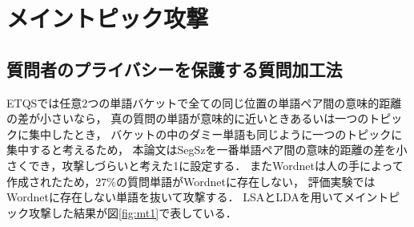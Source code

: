 \documentclass[master]{suribt}
\theoremstyle{definition}
\begin{document}
 \section{メイントピック攻撃}
 \subsection{質問者のプライバシーを保護する質問加工法}
 ETQSでは任意2つの単語バケットで全ての同じ位置の単語ペア間の意味的距離の差が小さいなら，
 真の質問の単語が意味的に近いときあるいは一つのトピックに集中したとき，
 バケットの中のダミー単語も同じように一つのトピックに集中すると考えるため，
 本論文はSegSzを一番単語ペア間の意味的距離の差を小さくでき，攻撃しづらいと考えた1に設定する．
 またWordnetは人の手によって作成されたため，$27\%$の質問単語がWordnetに存在しない，
 評価実験ではWordnetに存在しない単語を抜いて攻撃する．
 LSAとLDAを用いてメイントピック攻撃した結果が図\ref{fig:mt1}で表している．
  
\end{document}

